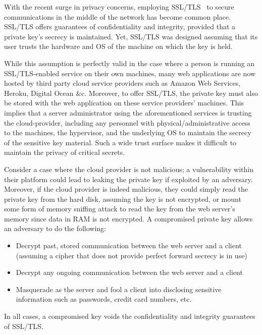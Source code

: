 \documentclass[../main.tex]{subfiles}
\begin{document}
With the recent surge in privacy concerns, employing
SSL/TLS~\cite{sslrfc,sslbook} to secure communications in the middle
of the network has become common place. SSL/TLS offers guarantees of
confidentiality and integrity, provided that a private key's secrecy
is maintained. Yet, SSL/TLS was designed assuming that its user trusts
the hardware and OS of the machine on which the key is held.
 
While this assumption is perfectly valid in the case where a person is
running an SSL/TLS-enabled service on their own machines, many web
applications are now hosted by third party cloud service providers
such as Amazon Web Services, Heroku, Digital Ocean \&c. Moreover, to
offer SSL/TLS, the private key must also be stored with the web
application on these service providers' machines. This implies that a
server administrator using the aforementioned services is trusting the
cloud-provider, including any personnel with physical/administrative
access to the machines, the hypervisor, and the underlying OS to
maintain the secrecy of the sensitive key material. Such a wide trust
surface makes it difficult to maintain the privacy of critical
secrets.

Consider a case where the cloud provider is not malicious; a
vulnerability within their platform could lead to leaking the private
key if exploited by an adversary. Moreover, if the cloud provider is
indeed malicious, they could simply read the private key from the hard
disk, assuming the key is not encrypted, or mount some form of memory
sniffing attack to read the key from the web server's memory since
data in RAM is not encrypted. A compromised private key allows an
adversary to do the following:
\begin{itemize}
  \item Decrypt past, stored communication between the web server and a
    client (assuming a cipher that does not provide perfect forward
    secrecy is in use)
  \item Decrypt any ongoing communication between the web server and a
    client
  \item Masquerade as the server and fool a client into disclosing
    sensitive information such as passwords, credit card numbers, etc.
\end{itemize}
In all cases, a compromised key voids the confidentiality and integrity
guarantees of SSL/TLS.
\end{document}
